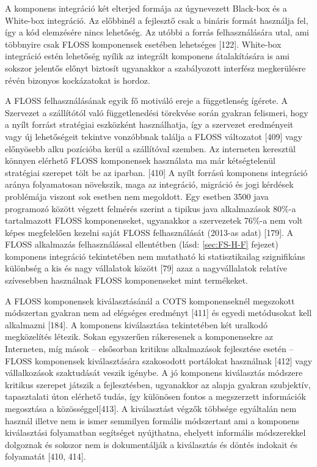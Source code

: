 \documentclass[12pt,magyar,a4paper,oneside]{scrreprt}
\begin{document}
A komponens integráció két elterjed formája az úgynevezett Black-box és
a White-box integráció. Az előbbinél a fejlesztő csak a bináris formát
használja fel, így a kód elemzésére nincs lehetőség. Az utóbbi a forrás
felhasználására utal, ami többnyire csak FLOSS komponensek esetében
lehetséges {[}122{]}. White-box integráció estén lehetőség nyílik az
integrált komponens átalakítására is ami sokszor jelentős előnyt
biztosít ugyanakkor a szabályozott interfész megkerülésre révén bizonyos
kockázatokat is hordoz.

A FLOSS felhasználásának egyik fő motiváló ereje a függetlenség ígérete.
A Szervezet a szállítótól való függetlenedési törekvése során gyakran
felismeri, hogy a nyílt forrást stratégiai eszközként használhatja, így
a szervezet eredményeit vagy új lehetőségeit tekintve vonzóbbnak találja
a FLOSS változatot {[}409{]} vagy előnyösebb alku pozícióba kerül a
szállítóval szemben. Az interneten keresztül könnyen elérhető FLOSS
komponensek használata ma már kétségtelenül stratégiai szerepet tölt be
az iparban. {[}410{]} A nyílt forrású komponens integráció aránya
folyamatosan növekszik, maga az integráció, migráció és jogi kérdések
problémája viszont sok esetben nem megoldott. Egy esetben 3500 java
programozó között végzett felmérés szerint a tipikus java alkalmazások
80\%-a tartalmazott FLOSS komponenseket, ugyanakkor a szervezetek 76\%-a
nem volt képes megfelelően kezelni saját FLOSS felhasználását (2013-as
adat) {[}179{]}. A FLOSS alkalmazás felhasználással ellentétben (lásd:
\ref{sec:FS-H-F} fejezet) komponens integráció tekintetében nem
mutatható ki statisztikailag szignifikáns különbség a kis és nagy
vállalatok között {[}79{]} azaz a nagyvállalatok relatíve szívesebben
használnak FLOSS komponenseket mint termékeket.

A FLOSS komponensek kiválasztásánál a COTS komponenseknél megszokott
módszertan gyakran nem ad elégséges eredményt {[}411{]} és egyedi
metódusokat kell alkalmazni {[}184{]}. A komponens kiválasztása
tekintetében két uralkodó megközelítés létezik. Sokan egyszerűen
rákeresenek a komponensekre az Interneten, míg mások -- elsősorban
kritikus alkalmazások fejlesztése esetén -- FLOSS komponensek
kiválasztására szakosodott portálokat használnak {[}412{]} vagy
vállalkozások szaktudását veszik igénybe. A jó komponens kiválasztás
módszere kritikus szerepet játszik a fejlesztésben, ugyanakkor az alapja
gyakran szubjektív, tapasztalati úton elérhető tudás, így különösen
fontos a megszerzett információk megosztása a közösséggel{[}413{]}. A
kiválasztást végzők többsége egyáltalán nem használ illetve nem is ismer
semmilyen formális módszertant ami a komponens kiválasztási folyamatban
segítséget nyújthatna, ehelyett informális módszerekkel dolgoznak és
sokszor nem is dokumentálják a kiválasztás és döntés indokait és
folyamatát {[}410, 414{]}.
\end{document}
